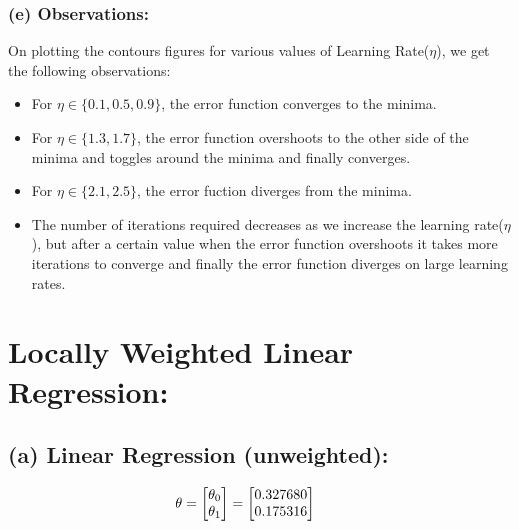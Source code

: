 \documentclass[a4 paper]{article}
\begin{document}
\subsubsection*{(e) Observations:}
On plotting the contours figures for various values of Learning Rate($\eta$), we get the following observations:
\begin{itemize}
	\item For $\eta \in \{0.1, 0.5, 0.9\}$, the error function converges to the minima.
	\item For $\eta \in \{1.3, 1.7\}$, the error function overshoots to the other side of the minima and toggles around the minima and finally converges.
	\item For $\eta \in \{2.1, 2.5\}$, the error fuction diverges from the minima.
	\item The number of iterations required decreases as we increase the learning rate($\eta$), but after a certain value when the error function overshoots it takes more iterations to converge and finally the error function diverges on large learning rates. 
\end{itemize}

\section{Locally Weighted Linear Regression:}

\vspace*{-0.15cm}

\subsection*{(a) Linear Regression (unweighted):}
\vspace*{-0.1cm}
$$ \hspace*{-0.75cm} \theta = 
\begin{bmatrix}
	\theta_0 \\  \theta_1 \\
\end{bmatrix}
= 
\begin{bmatrix}
	0.327680 \\
	0.175316
\end{bmatrix} $$
\end{document}
